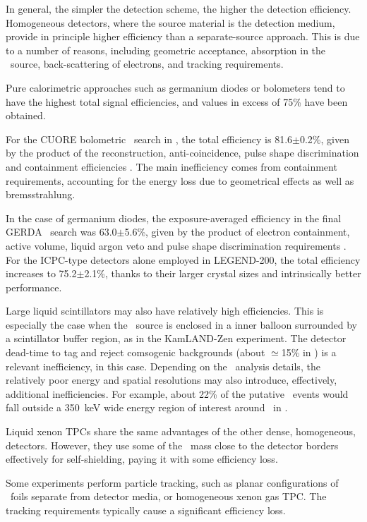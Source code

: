 In general, the simpler the detection scheme, the higher the detection efficiency. Homogeneous detectors, where the source material is the detection medium, provide in principle higher efficiency than a separate-source approach. This is due to a number of reasons, including geometric acceptance, absorption in the \bb\ source, back-scattering of electrons, and tracking requirements.

Pure calorimetric approaches such as germanium diodes or bolometers tend to have the highest total signal efficiencies, and values in excess of 75\% have been obtained. 

For the CUORE bolometric \bbonu\ search in , the total efficiency is 81.6$\pm$0.2\%, given by the product of the reconstruction, anti-coincidence, pulse shape discrimination and containment efficiencies \cite{CUORE:2021mvw}. The main inefficiency comes from containment requirements, accounting for the energy loss due to geometrical effects as well as bremsstrahlung.

In the case of germanium diodes, the exposure-averaged efficiency in the final GERDA \bbonu\ search was 63.0$\pm$5.6\%, given by the product of electron containment, active volume, liquid argon veto and pulse shape discrimination requirements \cite{GERDA:2020xhi}. For the ICPC-type detectors alone employed in LEGEND-200, the total efficiency increases to 75.2$\pm$2.1\%, thanks to their larger crystal sizes and intrinsically better performance.

Large liquid scintillators may also have relatively high efficiencies. This is especially the case when the \bb\ source is enclosed in a inner balloon surrounded by a scintillator buffer region, as in the KamLAND-Zen experiment. The detector dead-time to tag and reject comsogenic backgrounds (about $\simeq$15\% in \cite{KamLAND-Zen:2022tow}) is a relevant inefficiency, in this case. Depending on the \bbonu\ analysis details, the relatively poor energy and spatial resolutions may also introduce, effectively, additional inefficiencies. For example, about 22\% of the putative \bbonu\ events would fall outside a 350~keV wide energy region of interest around \Qbb\ in \cite{KamLAND-Zen:2022tow}.

Liquid xenon TPCs share the same advantages of the other dense, homogeneous, detectors. However, they use some of the \bb\ mass close to the detector borders effectively for self-shielding, paying it with some efficiency loss.

Some experiments perform particle tracking, such as planar configurations of \bb\ foils separate from detector media, or homogeneous xenon gas TPC. The tracking requirements typically cause a significant efficiency loss. 



